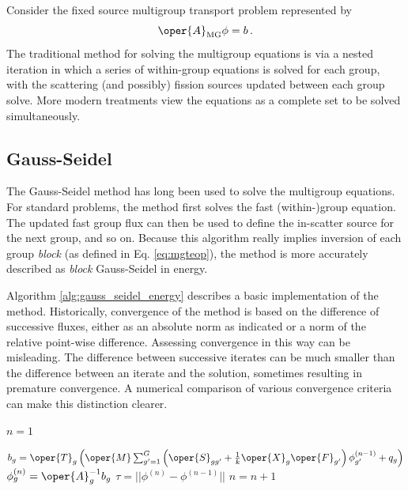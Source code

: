 Consider the fixed source multigroup transport problem
represented by
\begin{equation}
 \oper{A}_{\text{MG}} \phi = b \, .
\end{equation}
The traditional method for solving the multigroup equations is via 
a nested iteration in which a series of within-group equations is 
solved for each group, with the scattering (and possibly) fission 
sources updated between each group solve.  More modern treatments
view the equations as a complete set to be solved simultaneously.


\subsection{Gauss-Seidel}

The Gauss-Seidel method has long been used to solve the multigroup 
equations.  For standard problems, the method first solves the 
fast (within-)group equation.  The updated fast group flux can then be used 
to define the in-scatter source for the next group, and so on.  Because
this algorithm really implies inversion of each group \emph{block} (as 
defined in Eq. \ref{eq:mgteop}), the method is more accurately described 
as \emph{block} Gauss-Seidel in energy.


Algorithm \ref{alg:gauss_seidel_energy} describes a basic implementation 
of the method.  Historically, convergence of the method is based on the 
difference of successive fluxes, either as an absolute norm as indicated 
or a norm of the relative point-wise difference.  Assessing convergence 
in this way can be misleading.  The difference between successive
iterates can be much smaller than the difference between an iterate
and the solution, sometimes resulting in premature convergence.  A numerical
comparison of various convergence criteria can make this distinction clearer.

\begin{algorithm}[h]
  \DontPrintSemicolon
  $n = 1$ \;
  {
    {
      $b_g = \oper{T}_g \left(  \oper{M} \sum_{g'=1}^G 
              \left ( \oper{S}_{gg'} + \frac{1}{k}\oper{X}_{g} \oper{F}_{g'} 
              \right )\phi^{(n-1)}_{g'} + q_g \right )$ \;
      $\phi^{(n)}_{g} = \oper{A}^{-1}_g b_g$ \;
    }
    $\tau = ||\phi^{(n)}-\phi^{(n-1)}||$\;
    $n = n + 1$\;
    
  }
  \caption{Gauss-Seidel Algorithm for the Multigroup Transport Equation}
  \label{alg:gauss_seidel_energy}
\end{algorithm}

